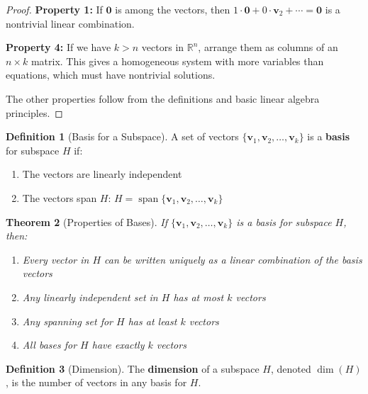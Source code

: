 \documentclass[12pt]{article}
\numberwithin{equation}{section}
\newcommand{\vect}[1]{\boldsymbol{#1}}   %
\newcommand{\Span}{\operatorname{span}}
\theoremstyle{plain}
\newtheorem{theorem}{Theorem}[section]
\theoremstyle{definition}
\newtheorem{definition}[theorem]{Definition}
\theoremstyle{remark}
\begin{document}
\begin{proof}
\textbf{Property 1:} If $\vect{0}$ is among the vectors, then $1 \cdot \vect{0} + 0 \cdot \vect{v}_2 + \cdots = \vect{0}$ is a nontrivial linear combination.

\textbf{Property 4:} If we have $k > n$ vectors in $\mathbb{R}^n$, arrange them as columns of an $n \times k$ matrix. This gives a homogeneous system with more variables than equations, which must have nontrivial solutions.

The other properties follow from the definitions and basic linear algebra principles.
\end{proof}

\begin{definition}[Basis for a Subspace]
A set of vectors $\{\vect{v}_1, \vect{v}_2, \ldots, \vect{v}_k\}$ is a \textbf{basis} for subspace $H$ if:
\begin{enumerate}
\item The vectors are linearly independent
\item The vectors span $H$: $H = \Span\{\vect{v}_1, \vect{v}_2, \ldots, \vect{v}_k\}$
\end{enumerate}
\end{definition}

\begin{theorem}[Properties of Bases]
If $\{\vect{v}_1, \vect{v}_2, \ldots, \vect{v}_k\}$ is a basis for subspace $H$, then:
\begin{enumerate}
\item Every vector in $H$ can be written uniquely as a linear combination of the basis vectors
\item Any linearly independent set in $H$ has at most $k$ vectors
\item Any spanning set for $H$ has at least $k$ vectors
\item All bases for $H$ have exactly $k$ vectors
\end{enumerate}
\end{theorem}

\begin{definition}[Dimension]
The \textbf{dimension} of a subspace $H$, denoted $\dim(H)$, is the number of vectors in any basis for $H$.
\end{definition}
\end{document}
